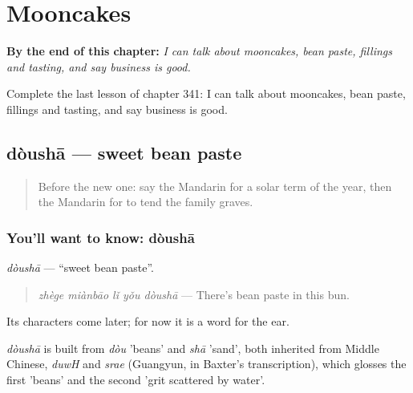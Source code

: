 
\chapter{Mooncakes}
\label{ch:zh-mooncakes}

\begin{chapteropening}
\textbf{By the end of this chapter:} \emph{I can talk about mooncakes, bean paste, fillings and tasting, and say business is good.}

Complete the last lesson of chapter 341: I can talk about mooncakes, bean paste, fillings and tasting, and say business is good.
\end{chapteropening}

\section[dòushā]{dòushā — sweet bean paste}

\label{lesson:ZH-C341-dousha}



\begin{quote}
Before the new one: say the Mandarin for a solar term of the year, then the Mandarin for to tend the family graves.
\end{quote}

\subsection*{You'll want to know: dòushā}
\emph{dòushā} — \textquotedblleft{}sweet bean paste\textquotedblright{}.

\begin{quote}
\emph{zhège miànbāo lǐ yǒu dòushā} — There's bean paste in this bun.
\end{quote}

Its characters come later; for now it is a word for the ear.

\begin{cousinweb}
\emph{dòushā} is built from \emph{dòu} 'beans' and \emph{shā} 'sand', both inherited from Middle Chinese, \emph{duwH} and \emph{srae} (Guangyun, in Baxter's transcription), which glosses the first 'beans' and the second 'grit scattered by water'.
\end{cousinweb}

